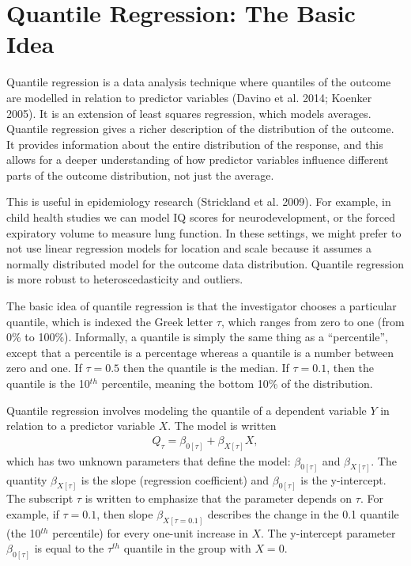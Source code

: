 \documentclass[
  letterpaper,
  DIV=11,
  numbers=noendperiod]{scrartcl}
\begin{document}
\section{Quantile Regression: The Basic
Idea}\label{quantile-regression-the-basic-idea}

Quantile regression is a data analysis technique where quantiles of the
outcome are modelled in relation to predictor variables (Davino et al.
2014; Koenker 2005). It is an extension of least squares regression,
which models averages. Quantile regression gives a richer description of
the distribution of the outcome. It provides information about the
entire distribution of the response, and this allows for a deeper
understanding of how predictor variables influence different parts of
the outcome distribution, not just the average.

This is useful in epidemiology research ({Strickland et al.} 2009). For
example, in child health studies we can model IQ scores for
neurodevelopment, or the forced expiratory volume to measure lung
function. In these settings, we might prefer to not use linear
regression models for location and scale because it assumes a normally
distributed model for the outcome data distribution. Quantile regression
is more robust to heteroscedasticity and outliers.

The basic idea of quantile regression is that the investigator chooses a
particular quantile, which is indexed the Greek letter \(\tau\), which
ranges from zero to one (from 0\% to 100\%). Informally, a quantile is
simply the same thing as a ``percentile'', except that a percentile is a
percentage whereas a quantile is a number between zero and one. If
\(\tau=0.5\) then the quantile is the median. If \(\tau=0.1\), then the
quantile is the 10\(^{th}\) percentile, meaning the bottom 10\% of the
distribution.

Quantile regression involves modeling the quantile of a dependent
variable \(Y\) in relation to a predictor variable \(X\). The model is
written \[\begin{aligned}
Q_{\tau} = \beta_{0 [\tau]} + \beta_{X [\tau]} X, \label{eq-fqr-qrmodel.univar.with.taus}
\end{aligned}\] which has two unknown parameters that define the model:
\(\beta_{0 [\tau]}\) and \(\beta_{X [\tau]}\). The quantity
\(\beta_{X [\tau]}\) is the slope (regression coefficient) and
\(\beta_{0 [\tau]}\) is the y-intercept. The subscript \(\tau\) is
written to emphasize that the parameter depends on \(\tau\). For
example, if \(\tau=0.1\), then slope \(\beta_{X [\tau=0.1]}\) describes
the change in the 0.1 quantile (the 10\(^{th}\) percentile) for every
one-unit increase in \(X\). The y-intercept parameter
\(\beta_{0 [\tau]}\) is equal to the \(\tau^{th}\) quantile in the group
with \(X=0\).
\end{document}
